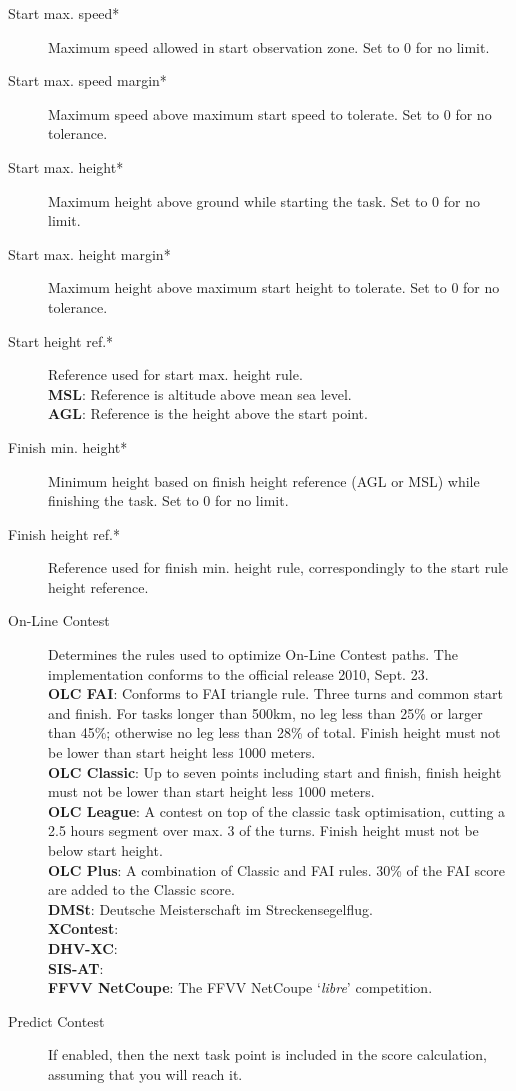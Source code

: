 \begin{description}
\item[Start max. speed*]  Maximum speed allowed in start observation zone.  Set 
  to 0 for no limit.
\item[Start max. speed margin*] Maximum speed above maximum start speed to tolerate. 
  Set to 0 for no tolerance.
\item[Start max. height*]  Maximum height above ground while starting the task. 
  Set to 0 for no limit.
\item[Start max. height margin*]  Maximum height above maximum start height to 
  tolerate.  Set to 0 for no tolerance.
\item[Start height ref.*]  Reference used for start max. height rule. \\
  {\bf MSL}: Reference is altitude above mean sea level. \\
  {\bf AGL}: Reference is the height above the start point.
\item[Finish min. height*]  Minimum height based on finish height reference 
  (AGL or MSL) while finishing the task.  Set to 0 for no limit.
\item[Finish height ref.*]  Reference used for finish min. height rule, 
  correspondingly to the start rule height reference.
\item[On-Line Contest]  Determines the rules used to optimize On-Line Contest 
  paths.  The implementation  conforms to the official release 2010, Sept. 23. \\
  {\bf OLC FAI}: Conforms to FAI triangle rule. Three turns and common start and 
  finish.  For tasks longer than
  500km, no leg less than 25\% or larger than 45\%; otherwise no leg less than 28\% 
  of total.  Finish height must not be lower than start height less 1000 meters. \\
  {\bf OLC Classic}: Up to seven points including start and finish, finish height
  must not be lower than start height less 1000 meters. \\
  {\bf OLC League}: A contest on top of the classic task optimisation, cutting
  a 2.5 hours segment over max. 3 of the turns. Finish height must not be below
  start height. \\
  {\bf OLC Plus}: A combination of Classic and FAI rules. 30\% of the FAI score
  are added to the Classic score. \\
  {\bf DMSt}: Deutsche Meisterschaft im Streckensegelflug. \\
  {\bf XContest}:  \\
  {\bf DHV-XC}:  \\
  {\bf SIS-AT}:  \\
  {\bf FFVV NetCoupe}: The FFVV NetCoupe `{\it libre}' competition.
\item[Predict Contest]  If enabled, then the next task point is included in the 
  score calculation, assuming that you will reach it.
\end{description}


